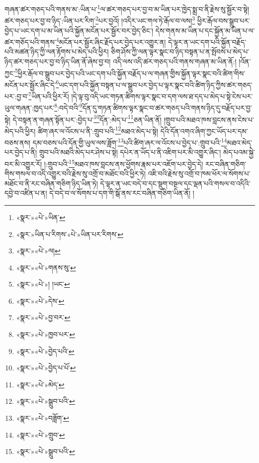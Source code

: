 གཞན་ཚར་གཅད་པའི་གནས་མ་:ཡིན་པ་\footnote{«སྣར་»«པེ་»ཡིན་}ལ་ཚར་གཅད་པར་བྱ་བ་མ་ཡིན་པར་ཁྱེད་སྨྲ་བ་ནི་རྗེས་སུ་སྦྱོར་བ་སྟེ། ཚར་གཅད་པར་བྱ་བ་ཉིད་:ཡིན་པར་རིག་\footnote{«སྣར་»ཡིན་པ་རིགས་«པེ་»ཡིན་པར་རིགས་}པར་བྱའོ། །འདིར་ཡང་གལ་ཏེ་རྒོལ་བ་ལས།\footnote{«སྣར་»«པེ་»ལ།} ཕྱིར་རྒོལ་བས་སྒྲུབ་པར་བྱེད་པ་ཡང་དག་པ་མ་ཡིན་པའི་སྐྱོན་མངོན་པར་སྦྱོར་བར་བྱེད་ཅིང་། དེས་གནས་མ་ཡིན་པ་དང་སྐྱོན་མ་ཡིན་པ་ལ་ཚར་གཅོད་པའི་གནས་\footnote{«སྣར་»«པེ་»གནས་སུ་}མངོན་པར་སྦྱོར་ཞིང་རྗོད་པར་བྱེད་པར་འགྱུར་ན། དེ་ལྟར་ན་ཡང་དག་པའི་སྐྱོན་བརྗོད་པའི་མཚན་ཉིད་ཀྱི་ལན་རྟོགས་པ་མེད་པའི་ཕྱིར། ཅིག་ཤོས་ཀྱི་ལན་ལྟར་སྣང་བ་ཉིད་བསྟན་པ་ན་སྤོབས་པ་མེད་པ་ཉིད་ཚར་གཅད་པར་བྱ་བ་ཉིད་ཡིན་ནོ་ཞེས་བྱ་བ། འདི་ལས་འདི་ཚར་གཅད་པའི་གནས་གཞན་མ་ཡིན་ནོ:། །འོན་ཀྱང་\footnote{«སྣར་»«པེ་»། །ཡང་}ཕྱིར་རྒོལ་བ་སྒྲུབ་པར་བྱེད་པའི་ཡང་དག་པའི་སྐྱོན་བརྗོད་པ་ལ་གཞན་གྱིས་སྐྱོན་ལྟར་སྣང་བའི་ཚིག་གིས་མངོན་པར་སྦྱོར་ཞིང་དེ་\footnote{«སྣར་»«པེ་»དེས་}ཡང་དག་པའི་སྐྱོན་བསྟན་པ་ལ་སྒྲུབ་པར་བྱེད་པ་ལྟར་སྣང་བའི་ཚིག་ཉིད་ཀྱིས་ཚར་གཅད་པར་:བྱ་བ་\footnote{«སྣར་»«པེ་»བྱ་བར་}ཡིན་པའི་ཕྱིར་རོ། །དེ་ལྟ་བུ་འདི་ཡང་གཏན་ཚིགས་ལྟར་སྣང་བ་དག་ལས་ཐ་དད་པ་མེད་པ་སྟེ་ངེས་པར་ཡུལ་གཞན་:ཁྱད་པར་\footnote{«སྣར་»«པེ་»ཁྱབ་པར་}:བདེ་བའི་\footnote{«སྣར་»«པེ་»བྱེད་པའི་}དོན་དུ་གཏན་ཚིགས་ལྟར་སྣང་བ་ཚར་གཅད་པའི་གནས་ཉིད་དུ་བརྗོད་པར་བྱ་སྟེ། དེ་བསྟན་ན་གཞན་སྟོན་པར་:བྱེད་པ་\footnote{«སྣར་»«པེ་»བྱེད་པ་པོ་}དོན་:མེད་པ་\footnote{«སྣར་»«པེ་»མེད་}ཅན་ཡིན་ནོ། །གྲུབ་པའི་མཐའ་ཁས་བླངས་ནས་ངེས་པ་མེད་པའི་ཕྱིར། ཚིག་ཞར་ལ་འོངས་པ་ནི་:གྲུབ་པའི་\footnote{«སྣར་»«པེ་»སྒྲུབ་པའི་}མཐའ་མེད་པ་སྟེ། དེའི་དོན་འགའ་ཞིག་ཀྱང་ཡོད་པར་དམ་བཅས་ནས། དམ་བཅས་པའི་དོན་གྱི་ཡུལ་ལས་ཟློག་\footnote{«སྣར་»«པེ་»བཟློག་}པའི་ཚིག་ཞར་ལ་འོངས་པ་བྱེད་པ་:གྲུབ་པའི་\footnote{«སྣར་»«པེ་»གྲུབ་}མཐའ་མེད་པར་བྱེད་པ་ནི། གྲུབ་པའི་མཐའི་མེད་པར་ཤེས་པ་སྟེ། དཔེར་ན་ཡོད་པ་ནི་འཇིག་པར་མི་འགྱུར་ཞིང་། མེད་པའམ་སྐྱེ་བར་མི་འགྱུར་རོ། །:གྲུབ་པའི་\footnote{«སྣར་»«པེ་»སྒྲུབ་པའི་}མཐའ་ཁས་བླངས་ནས་ཕྱོགས་རྣམ་པར་འཇོག་པར་བྱེད་དེ། རང་བཞིན་གཅིག་གིས་གསལ་བ་འདི་འགྱུར་བའི་རྗེས་སུ་འགྲོ་བ་མཐོང་བའི་ཕྱིར་ཏེ། འཇི་བའི་རྗེས་སུ་འགྲོ་བ་ཁམ་ཕོར་ལ་སོགས་པ་མཐོང་བ་ནི་རང་བཞིན་གཅིག་ཉིད་ཡིན་ཏེ། དེ་ལྟར་ན་ཡང་བདེ་བ་དང་སྡུག་བསྔལ་དང་ལྡན་པའི་གསལ་བ་འདིའི་དབྱེ་བ་འཛིན་པ་ན། དེ་བདེ་བ་ལ་སོགས་པ་དག་གི་སྒོ་ནས་རང་བཞིན་གཅིག་ཡིན་ནོ། །
